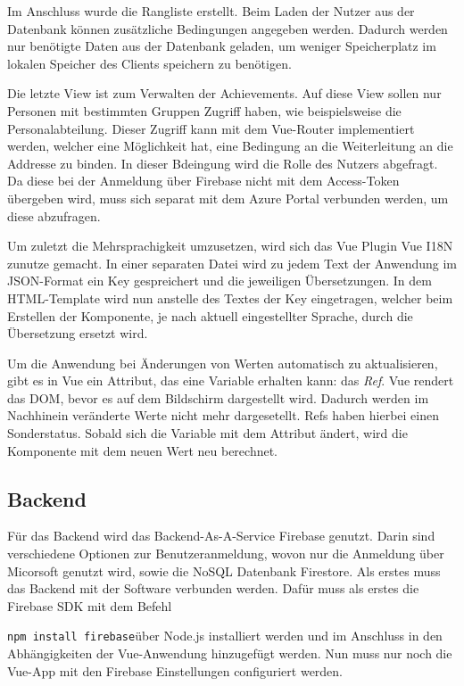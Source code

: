 \documentclass[12pt]{article}
\begin{document}
Im Anschluss wurde die Rangliste erstellt. Beim Laden der Nutzer aus der Datenbank können
zusätzliche Bedingungen angegeben werden. Dadurch werden nur benötigte Daten aus der
Datenbank geladen, um weniger Speicherplatz im lokalen Speicher des Clients speichern zu benötigen.

Die letzte View ist zum Verwalten der Achievements. Auf diese View sollen nur Personen
mit bestimmten Gruppen Zugriff haben, wie beispielsweise die Personalabteilung. Dieser Zugriff
kann mit dem Vue-Router implementiert werden, welcher eine Möglichkeit hat, eine Bedingung
an die Weiterleitung an die Addresse zu binden. In dieser Bdeingung wird die Rolle des
Nutzers abgefragt. Da diese bei der Anmeldung über Firebase nicht mit dem Access-Token
übergeben wird, muss sich separat mit dem Azure Portal verbunden werden, um diese abzufragen.

Um zuletzt die Mehrsprachigkeit umzusetzen, wird sich das Vue Plugin Vue I18N zunutze gemacht.
In einer separaten Datei wird zu jedem Text der Anwendung im JSON-Format ein Key gespreichert und
die jeweiligen Übersetzungen. In dem HTML-Template wird nun anstelle des Textes der Key eingetragen,
welcher beim Erstellen der Komponente, je nach aktuell eingestellter Sprache, durch die Übersetzung
ersetzt wird.

Um die Anwendung bei Änderungen von Werten automatisch zu aktualisieren, gibt es in Vue ein Attribut, das eine
Variable erhalten kann: das \textit{Ref}. Vue rendert das DOM, bevor es auf dem Bildschirm dargestellt wird.
Dadurch werden im Nachhinein veränderte Werte nicht mehr dargesetellt. Refs haben hierbei einen Sonderstatus.
Sobald sich die Variable mit dem Attribut ändert, wird die Komponente mit dem neuen Wert neu berechnet.



\subsection{Backend}

Für das Backend wird das Backend-As-A-Service Firebase genutzt. Darin sind verschiedene Optionen zur Benutzeranmeldung, 
wovon nur die Anmeldung über Micorsoft genutzt wird, sowie die NoSQL Datenbank Firestore. 
Als erstes muss das Backend mit der Software verbunden werden. Dafür muss als erstes die Firebase SDK mit dem Befehl

\texttt{npm install firebase}\newline über Node.js installiert werden und im Anschluss in den
Abhängigkeiten der Vue-Anwendung hinzugefügt werden.
Nun muss nur noch die Vue-App mit den Firebase Einstellungen configuriert werden.
\end{document}
